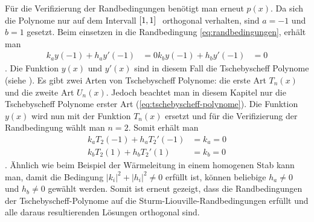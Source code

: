 Für die Verifizierung der Randbedingungen benötigt man erneut $p(x)$.
Da sich die Polynome nur auf dem Intervall $[\-1, 1 ]\ $ orthogonal verhalten, sind $a = -1$ und $b = 1$ gesetzt.
Beim einsetzen in die Randbedingung \ref{eq:randbedingungen}, erhält man
\begin{equation}
\begin{aligned}
	k_a y(-1) + h_a y'(-1) &= 0
	k_b y(-1) + h_b y'(-1) &= 0
\end{aligned} 
\end{equation}.
Die Funktion $y(x)$ und $y'(x)$ sind in diesem Fall die Tschebyscheff Polynome (siehe \label{sub:definiton_der_tschebyscheff-Polynome}).
Es gibt zwei Arten von Tschebyscheff Polynome: die erste Art $T_n(x)$ und die zweite Art $U_n(x)$.
Jedoch beachtet man in diesem Kapitel nur die Tschebyscheff Polynome erster Art (\ref{eq:tschebyscheff-polynome}).
Die Funktion $y(x)$ wird nun mit der Funktion $T_n(x)$ ersetzt und für die Verifizierung der Randbedingung wählt man $n=2$.
Somit erhält man
\begin{equation}
	\begin{aligned}
	k_a T_2(-1) + h_a T_{2}'(-1) &= k_a = 0\\
	k_b T_2(1) + h_b T_{2}'(1) &= k_b = 0
\end{aligned}
\end{equation}.
Ähnlich wie beim Beispiel der Wärmeleitung in einem homogenen Stab kann man, damit die Bedingung $|k_i|^2 + |h_i|^2\ne 0$ erfüllt ist, können beliebige $h_a \ne 0$ und $h_b \ne 0$ gewählt werden.
Somit ist erneut gezeigt, dass die Randbedingungen der Tschebyscheff-Polynome auf die Sturm-Liouville-Randbedingungen erfüllt und alle daraus resultierenden Lösungen orthogonal sind.

 










